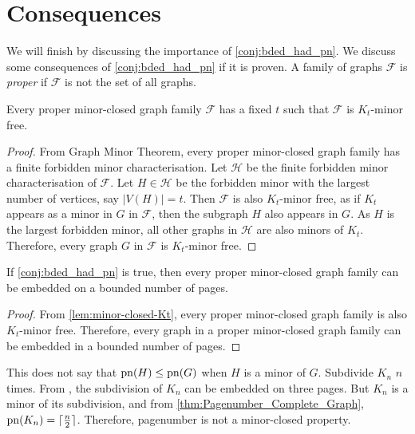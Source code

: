 \section{Consequences}
We will finish by discussing the importance of \cref{conj:bded_had_pn}. We discuss some consequences of \cref{conj:bded_had_pn} if it is proven. 
A family of graphs $\mathcal{F}$ is \textit{proper} if $\mathcal{F}$ is not the set of all graphs. 

\begin{lemma}\label{lem:minor-closed-Kt}
    Every proper minor-closed graph family $\mathcal{F}$ has a fixed $t$ such that $\mathcal{F}$ is $K_t$-minor free. 
\end{lemma}

\begin{proof}
    From \textcite{robertsonGraphMinorsXX2004} Graph Minor Theorem, every proper minor-closed graph family has a finite forbidden minor characterisation. Let $\mathcal{H}$ be the finite forbidden minor characterisation of $\mathcal{F}$. Let $H \in \mathcal{H}$ be the forbidden minor with the largest number of vertices, say $|V(H)| = t$. Then $\mathcal{F}$ is also $K_t$-minor free, as if $K_t$ appears as a minor in $G$ in $\mathcal{F}$, then the subgraph $H$ also appears in $G$. As $H$ is the largest forbidden minor, all other graphs in $\mathcal{H}$ are also minors of $K_t$. Therefore, every graph $G$ in $\mathcal{F}$ is $K_t$-minor free.
\end{proof}

\begin{lemma}\label{lem:Minor-Closed_Pagenumber}
    If \cref{conj:bded_had_pn} is true, then every proper minor-closed graph family can be embedded on a bounded number of pages.
\end{lemma}
\begin{proof}
    From \cref{lem:minor-closed-Kt}, every proper minor-closed graph family is also $K_t$-minor free. Therefore, every graph in a proper minor-closed graph family can be embedded in a bounded number of pages.
\end{proof}

This does not say that $\operatorname{pn}(H) \leq \operatorname{pn}(G)$ when $H$ is a minor of $G$. Subdivide $K_n$ $n$ times. From \textcite{atneosenEmbeddabilityCompactaNbooks}, the subdivision of $K_n$ can be embedded on three pages. But $K_n$ is a minor of its subdivision, and from \cref{thm:Pagenumber_Complete_Graph}, $\operatorname{pn}(K_n) = \lceil \frac{n}{2} \rceil$. Therefore, pagenumber is not a minor-closed property. 

